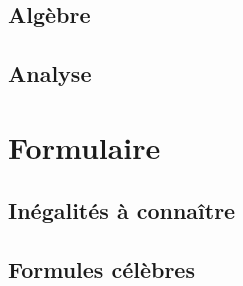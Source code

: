 \documentclass[12pt,a4paper]{exo_book}
\begin{document}
\section{Algèbre}

\section{Analyse}



\chapter{Formulaire}

\section{Inégalités à connaître}

\section{Formules célèbres}
\end{document}
